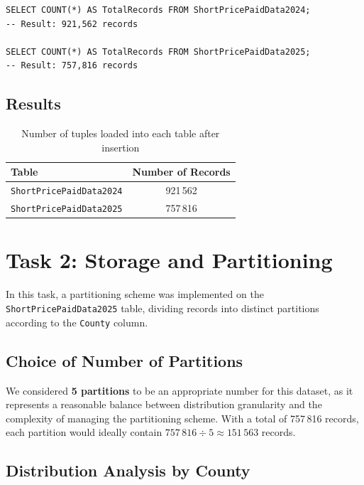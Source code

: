 \documentclass[a4paper,11pt]{article}
\begin{document}
\begin{lstlisting}[caption=Verification of the number of records in the final tables]
SELECT COUNT(*) AS TotalRecords FROM ShortPricePaidData2024;
-- Result: 921,562 records

SELECT COUNT(*) AS TotalRecords FROM ShortPricePaidData2025;
-- Result: 757,816 records
\end{lstlisting}

\subsection{Results}

\begin{table}[htbp]
\centering
\begin{tabular}{lc}
\toprule
\textbf{Table} & \textbf{Number of Records} \\
\midrule
\texttt{ShortPricePaidData2024} & 921\,562 \\
\texttt{ShortPricePaidData2025} & 757\,816 \\
\bottomrule
\end{tabular}
\caption{Number of tuples loaded into each table after insertion}
\end{table}

\section{Task 2: Storage and Partitioning}

In this task, a partitioning scheme was implemented on the \\ \texttt{ShortPricePaidData2025} table, dividing records into distinct partitions according to the \texttt{County} column.

\subsection{Choice of Number of Partitions}

We considered \textbf{5 partitions} to be an appropriate number for this dataset, as it represents a reasonable balance between distribution granularity and the complexity of managing the partitioning scheme. With a total of 757\,816 records, each partition would ideally contain $757\,816 \div 5 \approx 151\,563$ records.

\subsection{Distribution Analysis by County}
\end{document}
